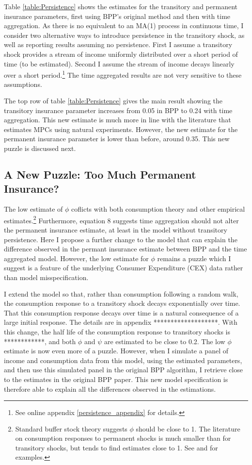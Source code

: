 \documentclass[AER]{AEA}
\begin{document}
Table \ref{table:Persistence} shows the estimates for the transitory and permanent insurance parameters, first using BPP's original method and then with time aggregation. As there is no equivalent to an MA(1) process in continuous time, I consider two alternative ways to introduce persistence in the transitory shock, as well as reporting results assuming no persistence. First I assume a transitory shock provides a stream of income uniformly distributed over a short period of time (to be estimated). Second I assume the stream of income decays linearly over a short period.\footnote{See online appendix \ref{persistence_appendix} for details.} The time aggregated results are not very sensitive to these assumptions.

The top row of table \ref{table:Persistence} gives the main result showing the transitory insurance parameter increases from 0.05 in BPP to 0.24 with time aggregation. This new estimate is much more in line with the literature that estimates MPCs using natural experiments. However, the new estimate for the permanent insurance parameter is lower than before, around 0.35. This new puzzle is discussed next.

\subsection{A New Puzzle: Too Much Permanent Insurance?}
The low estimate of $\phi$ coflicts with both consumption theory and other empirical estimates.\footnote{Standard buffer stock theory suggests $\phi$ should be close to 1. The literature on consumption responses to permanent shocks is much smaller than for transitory shocks, but tends to find estimates close to 1. See  \cite{gelman_response_2016} and \cite{crawley_consumption_2018} for examples.} Furthermore, equation 8 suggests time aggregation should not alter the permanent insurance estimate, at least in the model without transitory persistence. Here I propose a further change to the model that can explain the difference observed in the permant insurance estimate between BPP and the time aggregated model. However, the low estimate for $\phi$ remains a puzzle which I suggest is a feature of the underlying Consumer Expenditure (CEX) data rather than model misspecification.

I extend the model so that, rather than consumption following a random walk, the consumption response to a transitory shock decays exponentially over time. That this consumption response decays over time is a natural consequence of a large initial response. The details are in appendix *******************. With this change, the half life of the consumption response to transitory shocks is ************, and both $\phi$ and $\psi$ are estimated to be close to 0.2. The low $\phi$ estimate is now even more of a puzzle. However, when I simulate a panel of income and consumption data from this model, using the estimated parameters, and then use this simulated panel in the original BPP algorithm, I retrieve close to the estimates in the original BPP paper. This new model specification is therefore able to explain all the differences observed in the estimations.
\end{document}
